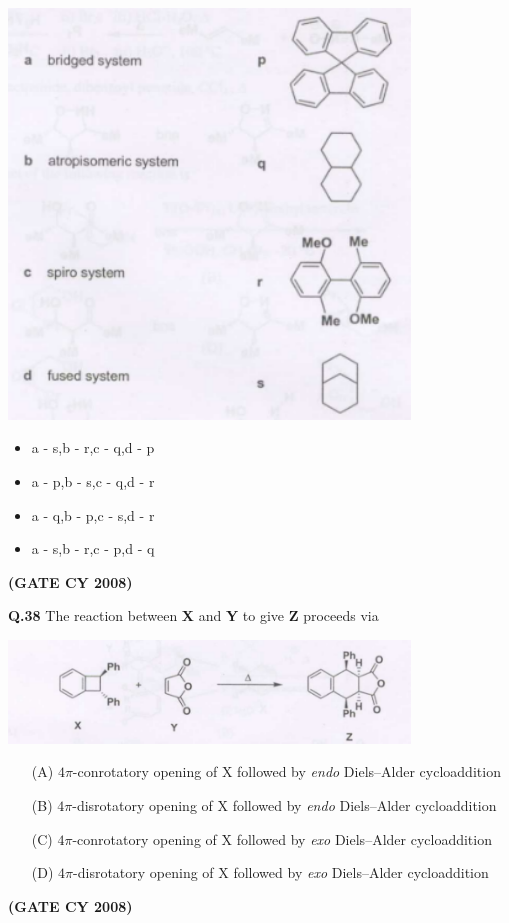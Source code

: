 \documentclass[12pt]{article}
\begin{document}
\begin{enumerate}
\begin{center}
    \includegraphics[width=0.8\textwidth]{figs/q37.png}
\end{center}
\begin{itemize}
    \item a - s,\quad b - r,\quad c - q,\quad d - p
    \item a - p,\quad b - s,\quad c - q,\quad d - r
    \item a - q,\quad b - p,\quad c - s,\quad d - r
    \item a - s,\quad b - r,\quad c - p,\quad d - q
\end{itemize}   \textbf{(GATE CY 2008)}


\textbf{Q.38} The reaction between \textbf{X} and \textbf{Y} to give \textbf{Z} proceeds via

\begin{center}
    \includegraphics[width=0.8\textwidth]{figs/q38.png}
\end{center}
\begin{enumerate}
    \item [(A)]$4\pi$-conrotatory opening of X followed by \textit{endo} Diels--Alder cycloaddition
    \item [(B)]$4\pi$-disrotatory opening of X followed by \textit{endo} Diels--Alder cycloaddition
    \item [(C)]$4\pi$-conrotatory opening of X followed by \textit{exo} Diels--Alder cycloaddition
    \item [(D)] $4\pi$-disrotatory opening of X followed by \textit{exo} Diels--Alder cycloaddition
\end{enumerate}   \textbf{(GATE CY 2008)}



\end{enumerate}
\end{document}
